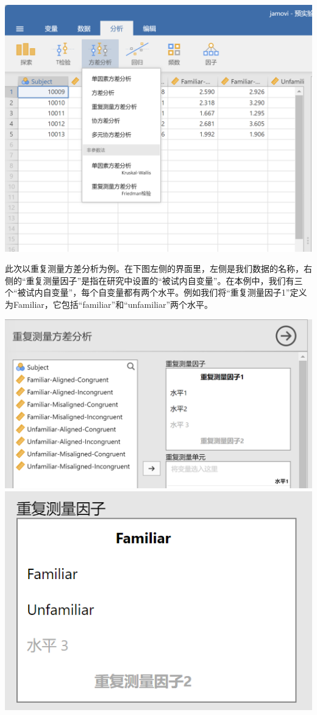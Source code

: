 \documentclass[]{ctexbook}
\theoremstyle{definition}
\theoremstyle{definition}
\theoremstyle{definition}
\theoremstyle{definition}
\theoremstyle{remark}
\begin{document}
\includegraphics{img/jamovi/anova.png}

此次以重复测量方差分析为例。在下图左侧的界面里，左侧是我们数据的名称，右侧的``重复测量因子''是指在研究中设置的``被试内自变量''。在本例中，我们有三个``被试内自变量''，每个自变量都有两个水平。例如我们将``重复测量因子1''定义为Familiar，它包括``familiar''和``unfamiliar''两个水平。

\includegraphics{img/jamovi/rmanova-factor.png}\\
\includegraphics{img/jamovi/rmanova-factorlevels.png}
\end{document}

